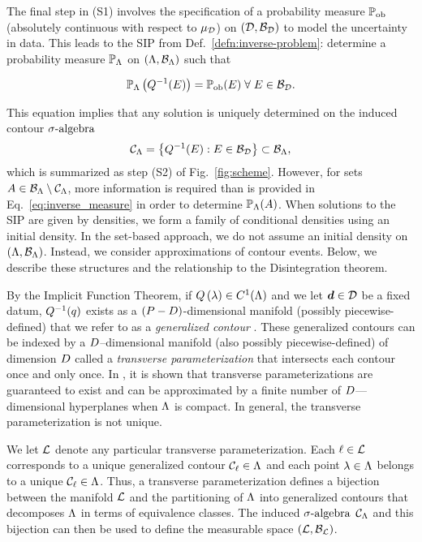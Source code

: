 The final step in (S1) involves the specification of a probability measure $\operatorname*{\mathbb{P}_{ob}}$ (absolutely continuous with respect to $\mu_{\mathcal{D}}$) on ${(\mathcal{D}, \mathcal{B}_{\mathcal{D}})}$ to model the uncertainty in data.
This leads to the SIP from Def.~\eqref{defn:inverse-problem}: determine a probability measure $\mathbb{P}_{\Lambda}$ on ${({\Lambda}, \mathcal{B}_{{\Lambda}})}$ such that

\begin{equation}\label{eq:inverse_measure}
\mathbb{P}_{\Lambda} \left ( Q^{-1}(E)\right ) = \operatorname*{\mathbb{P}_{ob}}(E) \; \forall \; E \in \mathcal{B}_{\mathcal{D}}.
\end{equation}

\noindent This equation implies that any solution is uniquely determined on the induced contour $\sigma\text{-algebra}$
\begin{equation}\label{eq:contour_sa}
\mathcal{C}_{{\Lambda}} = \left\{Q^{-1}(E) : E \in \mathcal{B}_{\mathcal{D}} \right\} \subset \mathcal{B}_{{\Lambda}},
\end{equation}
which is summarized as step (S2) of Fig.~\ref{fig:scheme}.
However, for sets $A \in \mathcal{B}_{{\Lambda}} \setminus \mathcal{C}_{{\Lambda}}$, more information is required than is provided in Eq.~\eqref{eq:inverse_measure} in order to determine $\mathbb{P}_{\Lambda} (A)$.
When solutions to the SIP are given by densities, we form a family of conditional densities using an initial density.
In the set-based approach, we do not assume an initial density on $({\Lambda}, \mathcal{B}_{{\Lambda}})$.
Instead, we consider approximations of contour events.
Below, we describe these structures and the relationship to the Disintegration theorem.

By the Implicit Function Theorem, if $Q\left ( \lambda \right ) \in C^1 ({\Lambda})$ and we let $\operatorname*{\boldsymbol{d}}\in\mathcal{D}$ be a fixed datum, $Q^{-1}(q)$ exists as a $(P-D)$\--dimensional manifold (possibly piecewise-defined) that we refer to as a \emph{generalized contour} \cite{BET+14}.
These generalized contours can be indexed by a $D$--dimensional manifold (also possibly piecewise-defined) of dimension $D$ called a \emph{transverse parameterization} that intersects each contour once and only once.
In \cite{BET+14}, it is shown that transverse parameterizations are guaranteed to exist and can be approximated by a finite number of $D$---dimensional hyperplanes when ${\Lambda}$ is compact.
In general, the transverse parameterization is not unique.

We let $\mathcal{L}$ denote any particular transverse parameterization.
Each $\ell\in\mathcal{L}$ corresponds to a unique generalized contour $\mathcal{C}_\ell \in {\Lambda}$ and each point $\lambda\in{\Lambda}$ belongs to a unique $\mathcal{C}_\ell\in{\Lambda}$.
Thus, a transverse parameterization defines a bijection between the manifold $\mathcal{L}$ and the partitioning of ${\Lambda}$ into generalized contours that decomposes ${\Lambda}$ in terms of equivalence classes.
The induced $\sigma\text{-algebra}$ $\mathcal{C}_{{\Lambda}}$ and this bijection can then be used to define the measurable space $(\mathcal{L}, \mathcal{B}_{\mathcal{L}})$.

